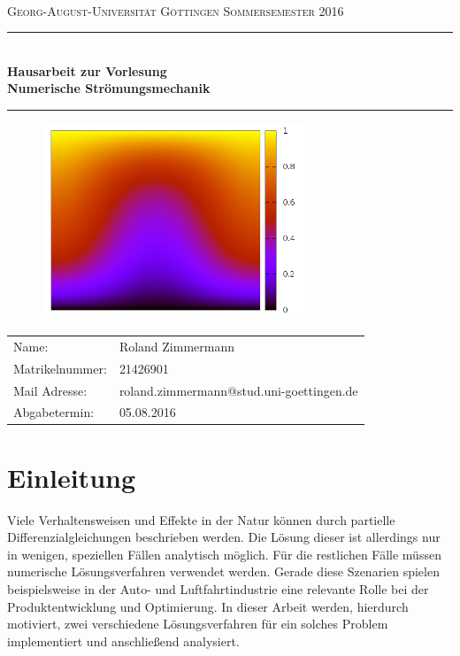 \documentclass[12pt,a4paper,titlepage,headinclude,bibtotoc]{scrartcl}
\begin{document}
%

\begin{titlepage}
\centering
\textsc{\Large \\
[1.5ex]Georg-August-Universität Göttingen Sommersemester 2016}

\vspace*{2.2cm}

\rule{\textwidth}{1pt}\\[0.5cm]
{\large \bfseries
  Hausarbeit zur Vorlesung\\[1.5ex]
  \huge Numerische Strömungsmechanik}
\rule{\textwidth}{1pt}

\vspace*{1.0cm}

\begin{figure}[H]  
	\centering
   \includegraphics[width=0.7\textwidth]{res/title/2_05.png}
\end{figure}

\begin{Large}
\begin{tabular}{ll}
Name: & Roland Zimmermann\\
Matrikelnummer:	& 21426901 \\
Mail Adresse: & roland.zimmermann@stud.uni-goettingen.de \\ 
Abgabetermin: & 05.08.2016\\
\end{tabular}
\end{Large}

\end{titlepage}



\tableofcontents

\newpage

\section{Einleitung}
\label{sec:einleitung}
Viele Verhaltensweisen und Effekte in der Natur können durch partielle Differenzialgleichungen beschrieben werden. Die Lösung dieser ist allerdings nur in wenigen, speziellen Fällen analytisch möglich. Für die restlichen Fälle müssen numerische Lösungsverfahren verwendet werden. Gerade diese Szenarien spielen beispielsweise in der Auto- und Luftfahrtindustrie eine relevante Rolle bei der Produktentwicklung und Optimierung. In dieser Arbeit werden, hierdurch motiviert, zwei verschiedene Lösungsverfahren für ein solches Problem implementiert und anschließend analysiert.
\end{document}
